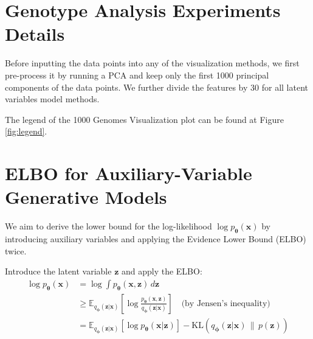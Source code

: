 \documentclass[letterpaper]{article} %
\newcommand{\bx}{\mathbf{x}}
\newcommand{\bz}{\mathbf{z}}
\let\oldtheta\theta
\renewcommand{\theta}{{\boldsymbol \oldtheta}}
\let\oldphi\phi
\renewcommand{\phi}{{\boldsymbol \oldphi}}
\begin{document}
\section{Genotype Analysis Experiments Details}



Before inputting the data points into any of the visualization methods, we first pre-process it by running a PCA and keep only the first 1000 principal components of the data points. We further divide the features by 30 for all latent variables model methods. 

The legend of the 1000 Genomes Visualization plot can be found at Figure \ref{fig:legend}.






\section{ELBO for Auxiliary-Variable Generative Models}

We aim to derive the lower bound for the log-likelihood $\log p_\theta(\bx)$ by introducing auxiliary variables and applying the Evidence Lower Bound (ELBO) twice.

Introduce the latent variable $\bz$ and apply the ELBO:
\begin{align}
    \log p_\theta(\bx) 
    &= \log \int p_\theta(\bx, \bz) \, d\bz \\
    &\geq \mathbb{E}_{q_\phi(\bz|\bx)} \left[ \log \frac{p_\theta(\bx, \bz)}{q_\phi(\bz|\bx)} \right] \quad \text{(by Jensen's inequality)} \\
    &= \mathbb{E}_{q_\phi(\bz|\bx)} \left[ \log p_\theta(\bx|\bz) \right] - \text{KL}\left( q_\phi(\bz|\bx) \,\|\, p(\bz) \right) \\
\end{align}
\end{document}
